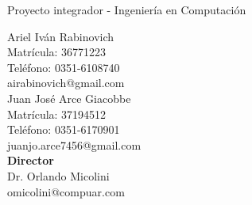 \documentclass[twoside, openright]{report}
\begin{document}
\begin{titlepage}
{ \selectfont
    \begin{center}

    
    \vspace{0.5cm}
    \begin{center}
        \begin{doublespacing}
        	{ \Huge \textbf{\nombreTesis}}
        \end{doublespacing}
    \end{center}

    \noindent\makebox[\linewidth]{\rule{\textwidth}{0.2pt}}
    
    \vspace{0.5cm}
    { \Large Proyecto integrador - Ingeniería en Computación \\ }
    
    \vspace{1.5cm}
           \vspace{0.7cm}
           {\LARGE Ariel Iván Rabinovich } \\
            {\large Matrícula: 36771223 } \\
            {\large Teléfono: 0351-6108740 } \\
           {\large airabinovich@gmail.com } \\
           
           \vspace{0.7cm}
           {\LARGE Juan José Arce Giacobbe } \\
            {\large Matrícula: 37194512 } \\
            {\large Teléfono: 0351-6170901 } \\
           {\large juanjo.arce7456@gmail.com} \\
        
       \vspace{0.7cm}
           {\Large \textbf{Director} } \\ 
           {\Large Dr. Orlando Micolini } \\
           {\large omicolini@compuar.com } \\
       

\end{center}}
\end{titlepage}
\end{document}
